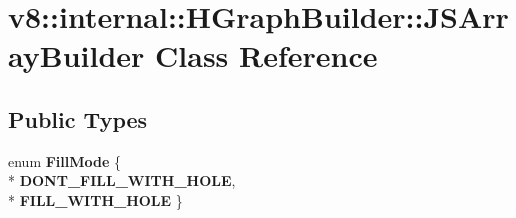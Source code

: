 \hypertarget{classv8_1_1internal_1_1_h_graph_builder_1_1_j_s_array_builder}{}\section{v8\+:\+:internal\+:\+:H\+Graph\+Builder\+:\+:J\+S\+Array\+Builder Class Reference}
\label{classv8_1_1internal_1_1_h_graph_builder_1_1_j_s_array_builder}
\subsection*{Public Types}
\begin{DoxyCompactItemize}
\item 
enum {\bfseries Fill\+Mode} \{ \\*
{\bfseries D\+O\+N\+T\+\_\+\+F\+I\+L\+L\+\_\+\+W\+I\+T\+H\+\_\+\+H\+O\+LE}, 
\\*
{\bfseries F\+I\+L\+L\+\_\+\+W\+I\+T\+H\+\_\+\+H\+O\+LE}
 \}\hypertarget{classv8_1_1internal_1_1_h_graph_builder_1_1_j_s_array_builder_a34259736e3646b7196f438498111b3c3}{}\label{classv8_1_1internal_1_1_h_graph_builder_1_1_j_s_array_builder_a34259736e3646b7196f438498111b3c3}

\end{DoxyCompactItemize}

